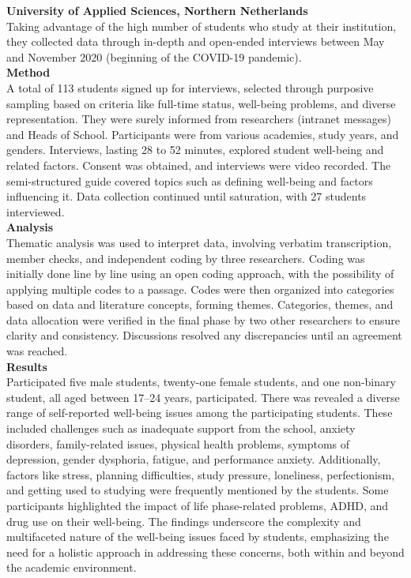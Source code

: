 \documentclass[11pt]{report}
\begin{document}
\textbf{University of Applied Sciences, Northern Netherlands \cite{research-1}}
\\ \normalsize Taking advantage of the high number of students who study at their institution, they collected data through in-depth and open-ended interviews between May and November 2020 (beginning of the COVID-19 pandemic).\vspace{5mm} \\
\textbf{Method} \\
A total of 113 students signed up for interviews, selected through purposive sampling based on criteria like full-time status, well-being problems, and diverse representation. They were surely informed from researchers (intranet messages) and Heads of School. Participants were from various academies, study years, and genders. Interviews, lasting 28 to 52 minutes, explored student well-being and related factors. Consent was obtained, and interviews were video recorded. The semi-structured guide covered topics such as defining well-being and factors influencing it. Data collection continued until saturation, with 27 students interviewed.\vspace{5mm} \\
\textbf{Analysis} \\
Thematic analysis was used to interpret data, involving verbatim transcription, member checks, and independent coding by three researchers. Coding was initially done line by line using an open coding approach, with the possibility of applying multiple codes to a passage. Codes were then organized into categories based on data and literature concepts, forming themes. Categories, themes, and data allocation were verified in the final phase by two other researchers to ensure clarity and consistency. Discussions resolved any discrepancies until an agreement was reached.\vspace{5mm} \\
\noindent \textbf{Results} \\
Participated five male students, twenty-one female students, and one non-binary student, all aged between 17–24 years, participated. There was revealed a diverse range of self-reported well-being issues among the participating students. These included challenges such as inadequate support from the school, anxiety disorders, family-related issues, physical health problems, symptoms of depression, gender dysphoria, fatigue, and performance anxiety. Additionally, factors like stress, planning difficulties, study pressure, loneliness, perfectionism, and getting used to studying were frequently mentioned by the students. Some participants highlighted the impact of life phase-related problems, ADHD, and drug use on their well-being. The findings underscore the complexity and multifaceted nature of the well-being issues faced by students, emphasizing the need for a holistic approach in addressing these concerns, both within and beyond the academic environment.\vspace{5mm} \\
\end{document}
